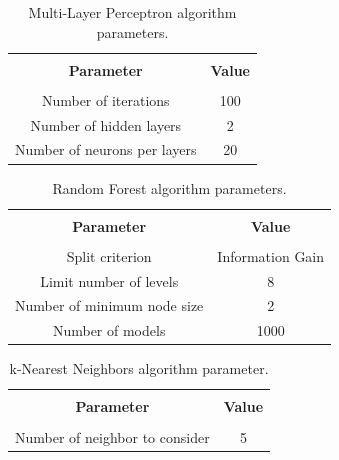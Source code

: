 \begin{table}[!ht]
	{\setlength{\tabcolsep}{12pt}
		\caption{Multi-Layer Perceptron algorithm parameters.}
		\begin{center}
			\vspace{-6mm}
			\begin{tabular}{cc}
				\hline \\[-2.45ex] \hline \\[-2.1ex]
				\textbf{Parameter} & \textbf{Value}\\
				\hline \\
				Number of iterations & 100 \\
				Number of hidden layers & 2 \\
				Number of neurons per layers & 20\\
				\hline
			\end{tabular}
			\vspace{-6mm}
		\end{center}
		\label{mlp}}
\end{table}

\begin{table}[!ht]
	{\setlength{\tabcolsep}{12pt}
		\caption{Random Forest algorithm parameters.}
		\begin{center}
			\vspace{-6mm}
			\begin{tabular}{cc}
				\hline \\[-2.45ex] \hline \\[-2.1ex]
				\textbf{Parameter} & \textbf{Value}\\
				\hline \\
				Split criterion & Information Gain \\
				Limit number of levels & 8 \\
				Number of minimum node size & 2 \\
				Number of models & 1000\\
				\hline
			\end{tabular}
			\vspace{-6mm}
		\end{center}
		\label{rf}}
\end{table}

\begin{table}[!ht]
	{\setlength{\tabcolsep}{12pt}
		\caption{k-Nearest Neighbors algorithm parameter.}
		\begin{center}
			\vspace{-6mm}
			\begin{tabular}{cc}
				\hline \\[-2.45ex] \hline \\[-2.1ex]
				\textbf{Parameter} & \textbf{Value}\\
				\hline \\
				Number of neighbor to consider & 5\\
				\hline
			\end{tabular}
			\vspace{-6mm}
		\end{center}
		\label{knn}}
\end{table}

